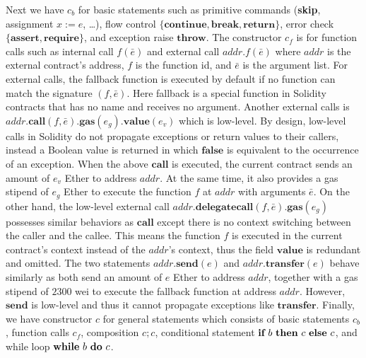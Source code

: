 Next we have $c_b$ for basic statements such as primitive commands (\textbf{skip}, assignment $x:=e$, \ldots), flow control $\{\textbf{continue},\textbf{break},\textbf{return}\}$,  error check $\{\textbf{assert},\textbf{require}\}$, and exception raise $\textbf{throw}$. The constructor $c_f$ is for function calls such as internal call $f(\bar{e})$ and external call $\textit{addr}.f(\bar{e})$ where $\textit{addr}$ is the external contract's address, $f$ is the function id, and $\bar{e}$ is the argument list. For external calls, the fallback function is executed by default if no function can match the signature $(f,\bar{e})$. Here fallback is a special function in Solidity contracts that has no name and receives no argument. Another external calls is $\textit{addr}.\textbf{call}(f,\bar{e}).\textbf{gas}(e_g).\textbf{value}(e_v)$ which is low-level. By design, low-level calls in Solidity do not propagate exceptions or return values to their callers, instead a Boolean value is returned in which $\textbf{false}$ is equivalent to the occurrence of an exception. When the above $\textbf{call}$ is executed, the current contract sends an amount of $e_v$ Ether to address $\textit{addr}$. At the same time, it also provides a gas stipend of $e_g$ Ether to execute the function $f$ at $\textit{addr}$ with arguments $\bar{e}$. On the other hand, the low-level external call $\textit{addr}.\textbf{delegatecall}(f,\bar{e}).\textbf{gas}(e_g)$ possesses similar behaviors as $\textbf{call}$ except there is no context switching between the caller and the callee. This means the function $f$ is executed in the current contract's context instead of the $\textit{addr}$'s context, thus the field $\textbf{value}$ is redundant and omitted.  The two statements $\textit{addr}.\textbf{send}(e)$ and $\textit{addr}.\textbf{transfer}(e)$ behave similarly as both send an amount of $e$ Ether to address $\textit{addr}$, together with a gas stipend of $2300$ wei to execute the fallback function at address  $\textit{addr}$. However, $\textbf{send}$ is low-level and thus it cannot propagate exceptions like $\textbf{transfer}$.  Finally, we have constructor $c$ for general statements which consists of basic statements $c_b$, function calls $c_f$, composition $c;c$, conditional statement $\textbf{if}~b~\textbf{then}~c~\textbf{else}~c$, and while loop $\textbf{while}~b~\textbf{do}~c$.

